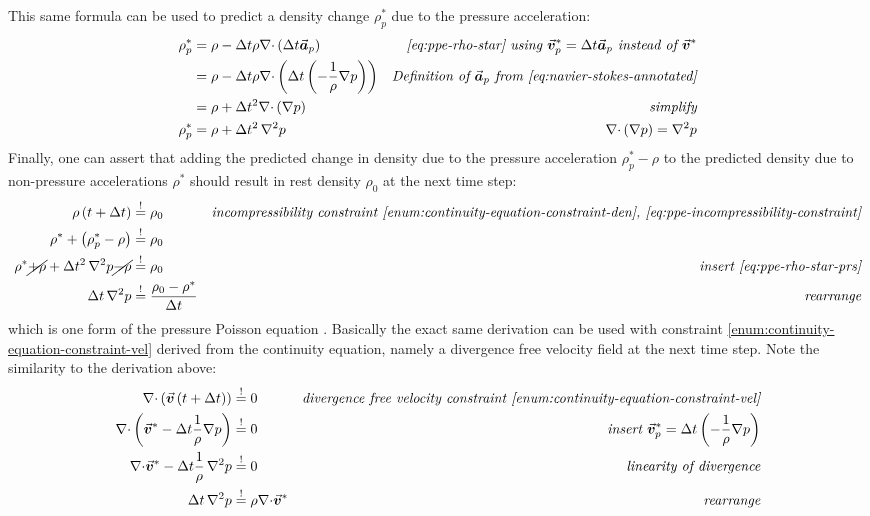 \documentclass[oneside, a4paper]{book}
\newcommand*\Laplace{\mathop{}\!\mathbin\nabla^2}
\newcommand\vek[1]{\vec{\bm{#1}}}
\newcommand\br[1]{\left(#1\right)}
\newcommand\divergence{{\nabla\cdot}}
\begin{document}
    This same formula can be used to predict a density change $\rho_p^*$ due to the pressure acceleration:
    \begin{align}
      \rho_p^* &= \rho - \Delta t \rho \divergence \br{\Delta t\vek{a}_p} &\textit{\autoref{eq:ppe-rho-star} using $\vek{v}^*_p = \Delta t \vek{a}_p$ instead of $\vek{v}^*$}\\
      &= \rho - \Delta t \rho \divergence \br{\Delta t\br{-\frac{1}{\rho}\nabla p}} &\textit{Definition of $\vek{a}_p$ from \autoref{eq:navier-stokes-annotated}}\\
      &= \rho + \Delta t^2 \divergence \br{\nabla p} &\textit{simplify}\\
      \rho_p^* &= \rho + \Delta t^2 \Laplace p &\textit{$\divergence \br{\nabla p} = \Laplace p$}\label{eq:ppe-rho-star-prs}
    \end{align}
    Finally, one can assert that adding the predicted change in density due to the pressure acceleration $\rho_p^* - \rho$ to the predicted density due to non-pressure accelerations $\rho^*$ should result in rest density $\rho_0$ at the next time step:
    \begin{align}
      \rho\br{t+\Delta t} &\overset{!}{=} \rho_0 &\textit{incompressibility constraint \autoref{enum:continuity-equation-constraint-den}, \autoref{eq:ppe-incompressibility-constraint}}\\
      \rho^* + \br{\rho_p^* - \rho} &\overset{!}{=} \rho_0 &\\
      \rho^* \cancel{+ \rho} + \Delta t^2 \Laplace p \cancel{- \rho} &\overset{!}{=} \rho_0 &\textit{insert \autoref{eq:ppe-rho-star-prs}}\\
      \Delta t \Laplace p &\overset{!}{=}\frac{\rho_0-\rho^*}{\Delta t} &\textit{rearrange}\label{eq:iisph-density-source-ppe}
    \end{align}
    which is one form of the pressure Poisson equation \autocite{tutorial2019}. 
    Basically the exact same derivation can be used with constraint \ref{enum:continuity-equation-constraint-vel} derived from the continuity equation, namely a divergence free velocity field at the next time step. Note the similarity to the derivation above:
    \begin{align}
      \divergence\br{\vek{v}\br{t+\Delta t}} &\overset{!}{=} 0&\textit{divergence free velocity constraint \ref{enum:continuity-equation-constraint-vel}}\\
      \divergence\br{\vek{v}^* - \Delta t \frac{1}{\rho}\nabla p} &\overset{!}{=} 0 &\textit{insert $\vek{v}_p^*=\Delta t \br{- \frac{1}{\rho}\nabla p}$}\\
      \divergence\vek{v}^* - \Delta t \frac{1}{\rho}\Laplace p &\overset{!}{=} 0 & \textit{linearity of divergence}\\\label{eq:velocity-divergence-source-ppe}
      \Delta t \Laplace p&\overset{!}{=} \rho \divergence\vek{v}^* &\textit{rearrange}
    \end{align}
\end{document}
